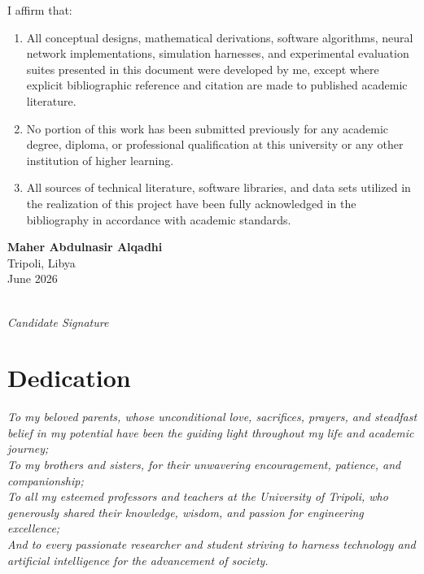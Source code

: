 \documentclass[12pt,a4paper,oneside]{report}
\begin{document}
I affirm that:
\begin{enumerate}
    \item All conceptual designs, mathematical derivations, software algorithms, neural network implementations, simulation harnesses, and experimental evaluation suites presented in this document were developed by me, except where explicit bibliographic reference and citation are made to published academic literature.
    \item No portion of this work has been submitted previously for any academic degree, diploma, or professional qualification at this university or any other institution of higher learning.
    \item All sources of technical literature, software libraries, and data sets utilized in the realization of this project have been fully acknowledged in the bibliography in accordance with academic standards.
\end{enumerate}

\vspace{2.0cm}

\noindent
\begin{minipage}{0.5\textwidth}
    \begin{flushleft}
        \textbf{Maher Abdulnasir Alqadhi}\\
        Tripoli, Libya\\
        June 2026
    \end{flushleft}
\end{minipage}
\hfill
\begin{minipage}{0.4\textwidth}
    \begin{flushright}
        \dotfill\\
        \emph{Candidate Signature}
    \end{flushright}
\end{minipage}

\clearpage

\chapter*{Dedication}

\vspace*{2.0cm}
\begin{center}
    \textit{To my beloved parents, whose unconditional love, sacrifices, prayers, and steadfast belief in my potential have been the guiding light throughout my life and academic journey;}\\[1.5cm]
    \textit{To my brothers and sisters, for their unwavering encouragement, patience, and companionship;}\\[1.5cm]
    \textit{To all my esteemed professors and teachers at the University of Tripoli, who generously shared their knowledge, wisdom, and passion for engineering excellence;}\\[1.5cm]
    \textit{And to every passionate researcher and student striving to harness technology and artificial intelligence for the advancement of society.}
\end{center}
\end{document}
